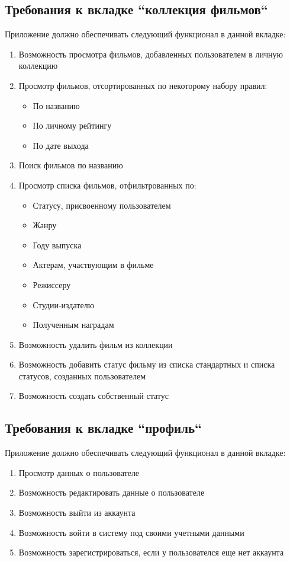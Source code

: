 \documentclass[a4paper,16pt]{article}
\begin{document}
\subsection{Требования к вкладке ``коллекция фильмов``}
Приложение должно обеспечивать следующий функционал в данной вкладке:
\begin{enumerate}
    \item Возможность просмотра фильмов, добавленных пользователем в личную коллекцию
    \item Просмотр фильмов, отсортированных по некоторому набору правил:
    \begin{itemize}
        \item По названию
        \item По личному рейтингу
        \item По дате выхода
    \end{itemize}
    \item Поиск фильмов по названию
    \item Просмотр списка фильмов, отфильтрованных по:
    \begin{itemize}
        \item Статусу, присвоенному пользователем
        \item Жанру
        \item Году выпуска
        \item Актерам, участвующим в фильме
        \item Режиссеру
        \item Студии-издателю
        \item Полученным наградам
    \end{itemize}
    \item Возможность удалить фильм из коллекции
    \item Возможность добавить статус фильму из списка стандартных и списка статусов, созданных пользователем
    \item Возможность создать собственный статус
\end{enumerate}
\subsection{Требования к вкладке ``профиль``}
Приложение должно обеспечивать следующий функционал в данной вкладке:
\begin{enumerate}
    \item Просмотр данных о пользователе
    \item Возможность редактировать данные о пользователе
    \item Возможность выйти из аккаунта
    \item Возможность войти в систему под своими учетными данными
    \item Возможность зарегистрироваться, если у пользователся еще нет аккаунта
\end{enumerate}
\end{document}
